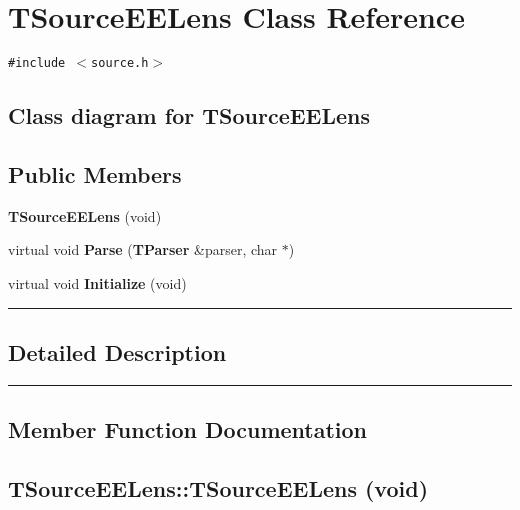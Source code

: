 \section{TSourceEELens  Class Reference}
\label{TSourceEELens}


{\tt \#include $<$source.h$>$}

\subsection*{Class diagram for TSourceEELens}
\begin{figure}[H]
\begin{center}
\leavevmode
\setlength{\epsfysize}{3cm}
\end{center}
\end{figure}
\subsection*{Public Members}
\begin{CompactItemize}
\item 
{\bf TSource\-EELens} (void)
\item 
virtual void {\bf Parse} ({\bf TParser} \&parser, char $\ast$)
\item 
virtual void {\bf Initialize} (void)
\end{CompactItemize}
\vspace{0.4cm}\hrule\vspace{0.2cm}
\subsection*{Detailed Description}
\vspace{0.4cm}\hrule\vspace{0.2cm}
\subsection*{Member Function Documentation}
\label{TSourceEELens_a0}
\subsection{\setlength{\rightskip}{0pt plus 5cm}TSource\-EELens::TSource\-EELens (void)}

\label{TSourceEELens_a1}
